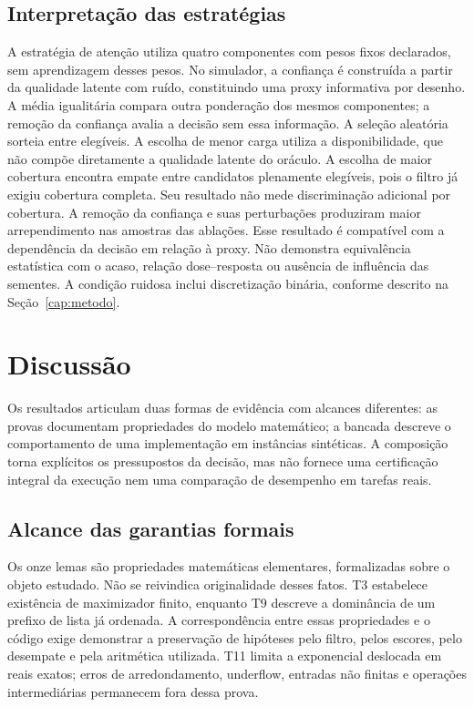 \documentclass[12pt,openany,oneside,a4paper,brazil,chapter=TITLE]{abntex2}
\begin{document}


\section{Interpretação das estratégias}
A estratégia de atenção utiliza quatro componentes com pesos fixos declarados, sem aprendizagem desses pesos. No simulador, a confiança é construída a partir da qualidade latente com ruído, constituindo uma proxy informativa por desenho. A média igualitária compara outra ponderação dos mesmos componentes; a remoção da confiança avalia a decisão sem essa informação.
A seleção aleatória sorteia entre elegíveis. A escolha de menor carga utiliza a disponibilidade, que não compõe diretamente a qualidade latente do oráculo. A escolha de maior cobertura encontra empate entre candidatos plenamente elegíveis, pois o filtro já exigiu cobertura completa. Seu resultado não mede discriminação adicional por cobertura.
A remoção da confiança e suas perturbações produziram maior arrependimento nas amostras das ablações. Esse resultado é compatível com a dependência da decisão em relação à proxy. Não demonstra equivalência estatística com o acaso, relação dose--resposta ou ausência de influência das sementes. A condição ruidosa inclui discretização binária, conforme descrito na Seção~\ref{cap:metodo}.



\chapter{Discussão}\label{cap:discussao}
Os resultados articulam duas formas de evidência com alcances diferentes: as provas documentam propriedades do modelo matemático; a bancada descreve o comportamento de uma implementação em instâncias sintéticas. A composição torna explícitos os pressupostos da decisão, mas não fornece uma certificação integral da execução nem uma comparação de desempenho em tarefas reais.
\section{Alcance das garantias formais}
Os onze lemas são propriedades matemáticas elementares, formalizadas sobre o objeto estudado. Não se reivindica originalidade desses fatos. T3 estabelece existência de maximizador finito, enquanto T9 descreve a dominância de um prefixo de lista já ordenada. A correspondência entre essas propriedades e o código exige demonstrar a preservação de hipóteses pelo filtro, pelos escores, pelo desempate e pela aritmética utilizada. T11 limita a exponencial deslocada em reais exatos; erros de arredondamento, underflow, entradas não finitas e operações intermediárias permanecem fora dessa prova.
\end{document}
